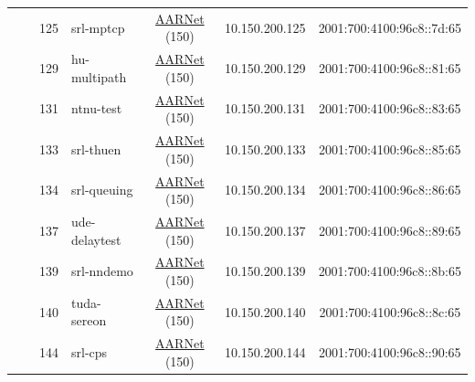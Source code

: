 \begin{small}
\begin{center}
\begin{longtable}{|c|c|c|c|c|c|c|c|}
  &  & \tiny{125} & \multicolumn{1}{|l|}{\tiny{srl-mptcp}} & \multicolumn{2}{|c|}{\tiny{\href{https://www.aarnet.edu.au/}{AARNet} (150)}} & \tiny{10.150.200.125} & \tiny{2001:700:4100:96c8::7d:65} \\* \cline{3-3}\cline{4-4}\cline{5-5}\cline{6-6}\cline{7-7}\cline{8-8}
  &  & \tiny{129} & \multicolumn{1}{|l|}{\tiny{hu-multipath}} & \multicolumn{2}{|c|}{\tiny{\href{https://www.aarnet.edu.au/}{AARNet} (150)}} & \tiny{10.150.200.129} & \tiny{2001:700:4100:96c8::81:65} \\* \cline{3-3}\cline{4-4}\cline{5-5}\cline{6-6}\cline{7-7}\cline{8-8}
  &  & \tiny{131} & \multicolumn{1}{|l|}{\tiny{ntnu-test}} & \multicolumn{2}{|c|}{\tiny{\href{https://www.aarnet.edu.au/}{AARNet} (150)}} & \tiny{10.150.200.131} & \tiny{2001:700:4100:96c8::83:65} \\* \cline{3-3}\cline{4-4}\cline{5-5}\cline{6-6}\cline{7-7}\cline{8-8}
  &  & \tiny{133} & \multicolumn{1}{|l|}{\tiny{srl-thuen}} & \multicolumn{2}{|c|}{\tiny{\href{https://www.aarnet.edu.au/}{AARNet} (150)}} & \tiny{10.150.200.133} & \tiny{2001:700:4100:96c8::85:65} \\* \cline{3-3}\cline{4-4}\cline{5-5}\cline{6-6}\cline{7-7}\cline{8-8}
  &  & \tiny{134} & \multicolumn{1}{|l|}{\tiny{srl-queuing}} & \multicolumn{2}{|c|}{\tiny{\href{https://www.aarnet.edu.au/}{AARNet} (150)}} & \tiny{10.150.200.134} & \tiny{2001:700:4100:96c8::86:65} \\* \cline{3-3}\cline{4-4}\cline{5-5}\cline{6-6}\cline{7-7}\cline{8-8}
  &  & \tiny{137} & \multicolumn{1}{|l|}{\tiny{ude-delaytest}} & \multicolumn{2}{|c|}{\tiny{\href{https://www.aarnet.edu.au/}{AARNet} (150)}} & \tiny{10.150.200.137} & \tiny{2001:700:4100:96c8::89:65} \\* \cline{3-3}\cline{4-4}\cline{5-5}\cline{6-6}\cline{7-7}\cline{8-8}
  &  & \tiny{139} & \multicolumn{1}{|l|}{\tiny{srl-nndemo}} & \multicolumn{2}{|c|}{\tiny{\href{https://www.aarnet.edu.au/}{AARNet} (150)}} & \tiny{10.150.200.139} & \tiny{2001:700:4100:96c8::8b:65} \\* \cline{3-3}\cline{4-4}\cline{5-5}\cline{6-6}\cline{7-7}\cline{8-8}
  &  & \tiny{140} & \multicolumn{1}{|l|}{\tiny{tuda-sereon}} & \multicolumn{2}{|c|}{\tiny{\href{https://www.aarnet.edu.au/}{AARNet} (150)}} & \tiny{10.150.200.140} & \tiny{2001:700:4100:96c8::8c:65} \\* \cline{3-3}\cline{4-4}\cline{5-5}\cline{6-6}\cline{7-7}\cline{8-8}
  &  & \tiny{144} & \multicolumn{1}{|l|}{\tiny{srl-cps}} & \multicolumn{2}{|c|}{\tiny{\href{https://www.aarnet.edu.au/}{AARNet} (150)}} & \tiny{10.150.200.144} & \tiny{2001:700:4100:96c8::90:65} \\* \cline{3-3}\cline{4-4}\cline{5-5}\cline{6-6}\cline{7-7}\cline{8-8}

\end{longtable}
\end{center}
\end{small}
